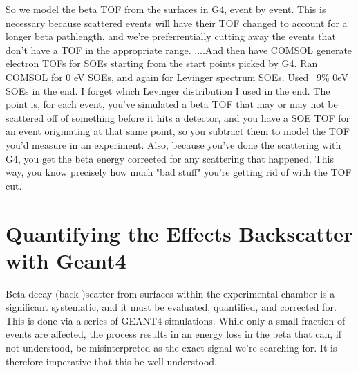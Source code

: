 	So we model the beta TOF from the surfaces in G4, event by event.  This is necessary because scattered  events will have their TOF changed to account for a longer beta pathlength, and we're preferrentially cutting away the events that don't have a TOF in the appropriate range.  ....And then have COMSOL generate electron TOFs for SOEs starting from the start points picked by G4.  Ran COMSOL for 0 eV SOEs, and again for Levinger spectrum SOEs.  Used ~9\% 0eV SOEs in the end.  I forget which Levinger distribution I used in the end.    The point is, for each event, you've simulated a beta TOF that may or may not be scattered off of something before it hits a detector, and you have a SOE TOF for an event originating at that same point, so you subtract them to model the TOF you'd measure in an experiment.  Also, because you've done the scattering with G4, you get the beta energy corrected for any scattering that happened.  This way, you know precisely  how much "bad stuff" you're getting rid of with the TOF cut.
	

\section{Quantifying the Effects Backscatter with Geant4}
	Beta decay (back-)scatter from surfaces within the experimental chamber is a significant systematic, and it must be evaluated, quantified, and corrected for.  This is done via a series of GEANT4 simulations.  While only a small fraction of events are affected, the process results in an energy loss in the beta that can, if not understood, be misinterpreted as the exact signal we're searching for.  It is therefore imperative that this be well understood. 


